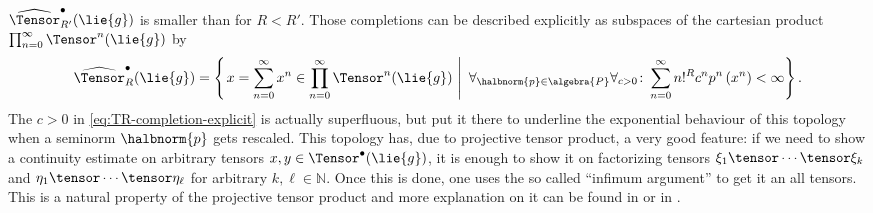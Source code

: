 \documentclass[
11pt,                          %
english                        %
]{article}
\begin{document}
$\widehat{\Tensor}_{R'}^{\bullet}(\lie{g})$ is smaller than for $R < R'$.
Those completions can be described explicitly as subspaces of the cartesian product 
$\prod_{n=0}^\infty \Tensor^n(\lie{g})$ by
\begin{equation}
	\label{eq:TR-completion-explicit}
	\widehat{\Tensor}_R^{\bullet}(\lie{g})
	=
	\left\{
	\left.
		x
		=
		\sum\limits_{n = 0}^\infty
		x^n
		\in
		\prod_{n=0}^\infty \Tensor^n(\lie{g})
	\ \right| \ 
		\forall_{\halbnorm{p} \in \algebra{P}}
		\forall_{c > 0}
		\colon
		\sum\limits_{n = 0}^\infty
		n!^R c^n p^n \left( x^n \right)
		<
		\infty
	\right\}.
\end{equation}
The $c > 0$ in \eqref{eq:TR-completion-explicit} is actually superfluous, but put it 
there to underline the exponential behaviour of this topology when a seminorm $
\halbnorm{p}$ gets rescaled.  This topology has, due to projective tensor product, a 
very good feature: if we need to show a continuity estimate on arbitrary tensors 
$x,y \in \Tensor^{\bullet}(\lie{g})$, it is enough to show it on factorizing tensors 
$\xi_1 \tensor \cdots \tensor \xi_k$ and $\eta_1 \tensor \cdots \tensor \eta_\ell$ 
for arbitrary $k, \ell \in \mathbb{N}$. Once this is done, one uses the so called 
``infimum argument'' to get it an all tensors. This is a natural property of the 
projective tensor product and more explanation on it can be found in
\cite[Proposition 3.2]{esposito.stapor.waldmann:2015a:pre} or in 
\cite[Lemma 3.2]{waldmann:2014a}. 
\end{document}
